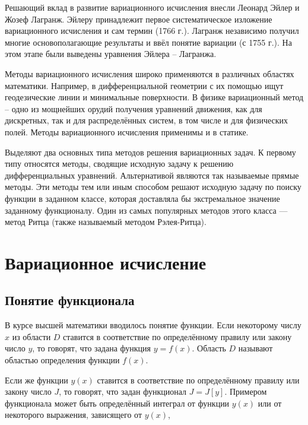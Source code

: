 \documentclass{article}
\begin{document}
Решающий вклад в развитие вариационного исчисления внесли Леонард Эйлер и Жозеф Лагранж. Эйлеру принадлежит первое систематическое изложение вариационного исчисления и сам термин (1766 г.). Лагранж независимо получил многие основополагающие результаты и ввёл понятие вариации (с 1755 г.). На этом этапе были выведены уравнения Эйлера – Лагранжа.

Методы вариационного исчисления широко применяются в различных областях математики. Например, в дифференциальной геометрии с их помощью ищут геодезические линии и минимальные поверхности. В физике вариационный метод – одно из мощнейших орудий получения уравнений движения, как для дискретных, так и для распределённых систем, в том числе и для физических полей. Методы вариационного исчисления применимы и в статике.

Выделяют два основных типа методов решения вариационных задач. К первому типу относятся методы, сводящие исходную задачу к решению дифференциальных уравнений. Альтернативой являются так называемые прямые методы. Эти методы тем или иным способом решают исходную задачу по поиску функции в заданном классе, которая доставляла бы экстремальное значение заданному функционалу. Один из самых популярных методов этого класса — метод Ритца (также называемый методом Рэлея-Ритца).


\section{Вариационное исчисление} %

\subsection{Понятие функционала}

В курсе высшей математики вводилось понятие функции. Если некоторому числу $x$ из области $D$ ставится в соответствие по определённому правилу или закону число $y$, то говорят, что задана функция $y=f(x)$. Область $D$ называют областью определения функции $f(x)$.

Если же функции $y(x)$ ставится в соответствие по определённому правилу или закону число $J$, то говорят, что задан функционал $J = J[y]$. Примером функционала может быть определённый интеграл от функции $y(x)$ или от некоторого выражения, зависящего от $y(x)$,
\end{document}
